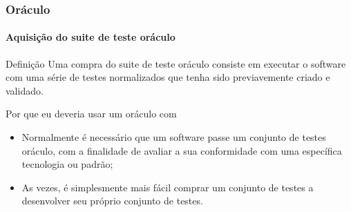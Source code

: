 \begin{frame}[hasprev=true, hasnext=false]
\label{concept:purchased-test-suite-oráculo}
\frametitle{Oráculo}
\framesubtitle{Aquisição do suite de teste oráculo}

\begin{block:concept}{Definição}
Uma compra do suite de teste oráculo consiste em executar o software com uma série de testes normalizados que tenha sido previavemente criado e validado.
\end{block:concept}

\begin{block:fact}{Por que eu deveria usar um oráculo com}
\begin{itemize}
	\item Normalmente é necessário que um software passe um conjunto de testes oráculo, com a finalidade de avaliar a sua conformidade com uma específica tecnologia ou padrão;

	\item As vezes, é simplesmente mais fácil comprar um conjunto de testes a desenvolver seu próprio conjunto de testes.
\end{itemize}
\end{block:fact}


\hfill
{}
\end{frame}
